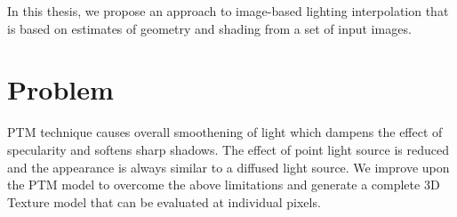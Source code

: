 




In this thesis, 
we propose an approach to image-based lighting interpolation that is
based on estimates of geometry and shading from a set of input images.
\section{Problem}

PTM technique causes overall smoothening of light which dampens the effect
of specularity and softens sharp shadows. The effect of point light source is
reduced and the appearance is always similar to a diffused light source.
We improve upon the PTM model 
to overcome the above limitations
and generate a complete 3D Texture model that can be evaluated at individual
pixels.  
